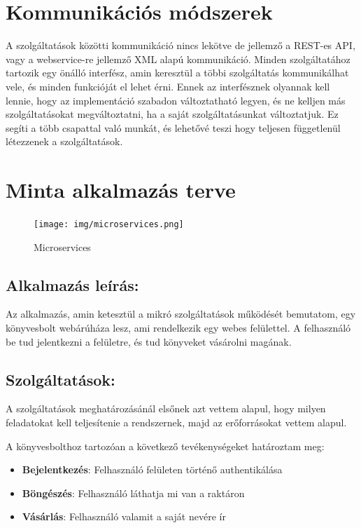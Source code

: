 \documentclass[11pt,magyar,a4paper,oneside,]{report}
\begin{document}
\chapter{Kommunikációs
módszerek}\label{kommunikuxe1ciuxf3s-muxf3dszerek}

A szolgáltatások közötti kommunikáció nincs lekötve de jellemző a
REST-es API, vagy a webservice-re jellemző XML alapú kommunikáció.
Minden szolgáltatához tartozik egy önálló interfész, amin keresztül a
többi szolgáltatás kommunikálhat vele, és minden funkcióját el lehet
érni. Ennek az interfésznek olyannak kell lennie, hogy az implementáció
szabadon változtatható legyen, és ne kelljen más szolgáltatásokat
megváltoztatni, ha a saját szolgáltatásunkat változtatjuk. Ez segíti a
több csapattal való munkát, és lehetővé teszi hogy teljesen függetlenül
létezzenek a szolgáltatások.

\chapter{Minta alkalmazás terve}\label{minta-alkalmazuxe1s-terve}

\begin{figure}[htbp]
\centering
\texttt{[image: img/microservices.png]}
\caption{Microservices}
\end{figure}

\section{Alkalmazás leírás:}\label{alkalmazuxe1s-leuxedruxe1s}

Az alkalmazás, amin ketesztül a mikró szolgáltatások működését
bemutatom, egy könyvesbolt webárúháza lesz, ami rendelkezik egy webes
felülettel. A felhasználó be tud jelentkezni a felületre, és tud
könyveket vásárolni magának.

\section{Szolgáltatások:}\label{szolguxe1ltatuxe1sok}

A szolgáltatások meghatározásánál elsőnek azt vettem alapul, hogy milyen
feladatokat kell teljesítenie a rendszernek, majd az erőforrásokat
vettem alapul.

A könyvesbolthoz tartozóan a következő tevékenységeket határoztam meg:

\begin{itemize}
\itemsep1pt\parskip0pt
\item
  \textbf{Bejelentkezés}: Felhasználó felületen történő authentikálása
\item
  \textbf{Böngészés}: Felhasználó láthatja mi van a raktáron
\item
  \textbf{Vásárlás}: Felhasználó valamit a saját nevére ír
\end{itemize}
\end{document}
